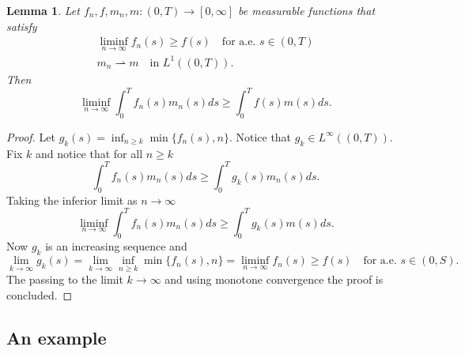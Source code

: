 \documentclass[letterpaper,oneside]{amsart}
\numberwithin{equation}{section}
\newtheorem{lemma}[theorem]{Lemma}
\theoremstyle{definition}
\begin{document}
\begin{lemma}
\label{lemma:technical-convergence-integral}
Let $f_n,f,m_n,m\colon(0,T)\to[0,\infty]$ be measurable functions that satisfy
\begin{gather*}
\liminf_{n\to\infty}f_n(s)\ge f(s)\quad\text{for a.e.\ $s\in(0,T)$} \\
m_n\rightharpoonup m\quad\text{in $L^1((0,T))$}.
\end{gather*}
Then
\[
\liminf_{n\to\infty}\int_0^Tf_n(s)m_n(s)ds\ge\int_0^Tf(s)m(s)ds.
\]
\end{lemma}
\begin{proof}
Let $g_k(s)=\inf_{n\ge k}\min\{f_n(s),n\}$. Notice that $g_k\in L^\infty((0,T))$. Fix $k$ and notice that for all $n\ge k$
\[
\int_0^Tf_n(s)m_n(s)ds\ge\int_0^Tg_k(s)m_n(s)ds.
\]
Taking the inferior limit as $n\to\infty$
\[
\liminf_{n\to\infty}\int_0^Tf_n(s)m_n(s)ds\ge\int_0^Tg_k(s)m(s)ds.
\]
Now $g_k$ is an increasing sequence and
\[
\lim_{k\to\infty}g_k(s)=\lim_{k\to\infty}\inf_{n\ge k}\min\{f_n(s),n\}=\liminf_{n\to\infty}f_n(s)\ge f(s)\quad\text{for a.e.\ $s\in(0,S)$}.
\]
The passing to the limit $k\to\infty$ and using monotone convergence the proof is concluded.
\end{proof}

\subsection{An example}
\end{document}
